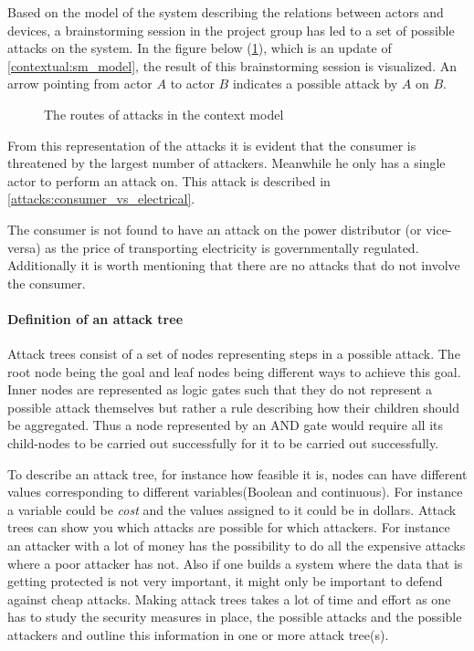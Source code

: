 
Based on the model of the system describing the relations between actors and devices, a brainstorming session in the project group has led to a set of possible attacks on the system.
In the figure below (\cref{contextual:sm_model_attack}), which is an update of \cref{contextual:sm_model}, the result of this brainstorming session is visualized.
An arrow pointing from actor $A$ to actor $B$ indicates a possible attack by $A$ on $B$.

\begin{figure}[H]
  \centering
  
  \caption{The routes of attacks in the context model}
  \label{contextual:sm_model_attack}
\end{figure}

From this representation of the attacks it is evident that the consumer is threatened by the largest number of attackers.
Meanwhile he only has a single actor to perform an attack on.
This attack is described in \cref{attacks:consumer_vs_electrical}.

The consumer is not found to have an attack on the power distributor (or vice-versa) as the price of transporting electricity is governmentally regulated.
Additionally it is worth mentioning that there are no attacks that do not involve the consumer.

\paragraph{Definition of an attack tree}
Attack trees consist of a set of nodes representing steps in a possible attack.
The root node being the goal and leaf nodes being different ways to achieve this goal.
Inner nodes are represented as logic gates such that they do not represent a possible attack themselves but rather a rule describing how their children should be aggregated.
Thus a node represented by an AND gate would require all its child-nodes to be carried out successfully for it to be carried out successfully.

To describe an attack tree, for instance how feasible it is, nodes can have different values corresponding to different variables(Boolean and continuous).
For instance a variable could be \textit{cost} and the values assigned to it could be in dollars.
Attack trees can show you which attacks are possible for which attackers.
For instance an attacker with a lot of money has the possibility to do all the expensive attacks where a poor attacker has not.
Also if one builds a system where the data that is getting protected is not very important, it might only be important to defend against cheap attacks.
Making attack trees takes a lot of time and effort as one has to study the security measures in place, the possible attacks and the possible attackers and outline this information in one or more attack tree(s).\cite{schneier_attack_trees}
